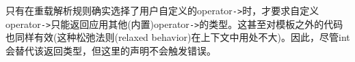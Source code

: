 只有在重载解析规则确实选择了用户自定义的operator\texttt{->}时，才要求自定义operator\texttt{->}只能返回应用其他(内置)operator\texttt{->}的类型。这甚至对模板之外的代码也同样有效(这种松弛法则(relaxed behavior)在上下文中用处不大)。因此，尽管int会替代该返回类型，但这里的声明不会触发错误。






































